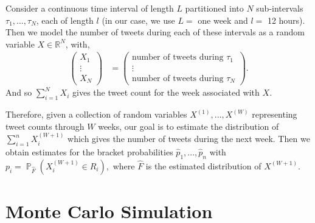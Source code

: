 \documentclass{article}
\DeclareMathOperator{\Pro}{\mathbb{P}}
\begin{document}
Consider a continuous time interval of length $L$ partitioned into $N$ sub-intervals
$\tau_1,...,\tau_N$, each of length $l$ (in our case, we use $L=$ one week and $l=$ 12 hours). Then we model the number of tweets during each of these intervals
as a random variable $X \in \mathbb{R}^N$, with,
\begin{align*}
\begin{pmatrix}
    X_1\\ \vdots \\X_N
\end{pmatrix}  &= 
\begin{pmatrix}
    \text{number of tweets during } \tau_1
    \\ \vdots \\
    \text{number of tweets during } \tau_N
\end{pmatrix}.
\end{align*}
And so $\sum_{i=1}^N X_i$ gives the tweet count for the week associated with $X$.

Therefore, given a collection of random variables $X^{(1)},...,X^{(W)}$ representing tweet counts through $W$ weeks, our goal is to estimate
the distribution of $\sum_{i=1}^n X_i^{(W+1)}$ which gives the number of tweets during the next week.
Then we obtain estimates for the bracket probabilities $\hat{p}_1,...,\hat{p}_n$
with
$p_i = \Pro_{\hat{F}}(X_i^{(W+1)} \in R_i),$ where $\hat{F}$ is the estimated distribution of $X^{(W+1)}$.




\section{Monte Carlo Simulation}
\end{document}
